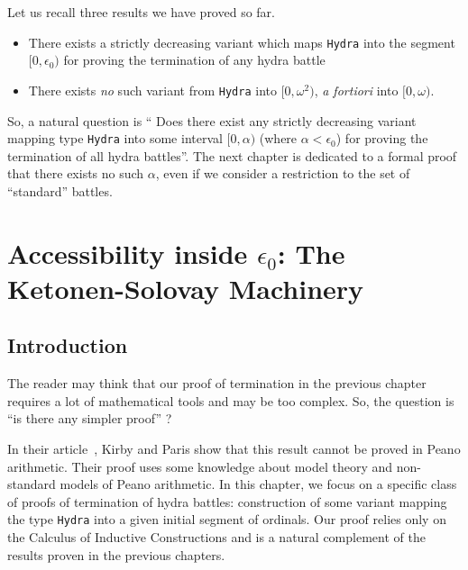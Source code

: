     Let us recall three results we have proved so far.
    \begin{itemize}
    \item There exists a strictly decreasing variant which maps \texttt{Hydra} into 
    the segment $[0,\epsilon_0)$ for proving the termination of any hydra battle
    \item There exists \emph{no} such variant from \texttt{Hydra} into 
    $[0,\omega^2)$, \emph{a fortiori} into $[0,\omega)$.
    \end{itemize}

    So, a  natural question is `` Does there exist any strictly decreasing variant mapping
    type \texttt{Hydra} into some interval $[0,\alpha)$ (where $\alpha <\epsilon_0$) for proving the termination of all hydra battles''. The next chapter is dedicated to a formal proof that there exists no such $\alpha$, even if we consider a restriction to the set of ``standard'' battles.













\chapter[The Ketonen-Solovay machinery]{Accessibility inside \texorpdfstring{$\epsilon_0$}{Epsilon0}: The Ketonen-Solovay Machinery\label{ks-chapter}}
\label{chap:ketonen}

\section{Introduction}
The reader may think that our proof of termination in the previous  chapter requires a lot of mathematical tools and may be too  complex. So, the question is ``is there  any  simpler proof'' ?

In their article~\cite{KP82}, Kirby and Paris show that this result cannot be proved in Peano arithmetic. Their proof uses some knowledge about model theory and non-standard models of Peano arithmetic. In this chapter, we focus on a specific class of proofs of termination of hydra battles: construction of some variant mapping the type \texttt{Hydra} into a given initial  segment of ordinals. Our proof relies only on the Calculus of Inductive Constructions and is a natural complement of the results proven in the previous chapters.

